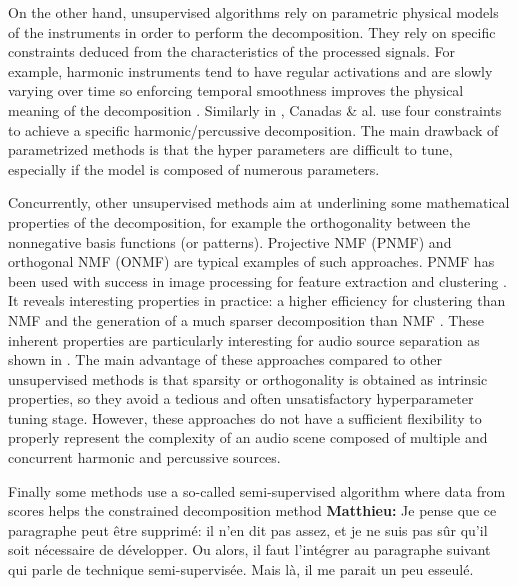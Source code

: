 \documentclass[journal]{IEEEtran}
\def\MK{\color{blue} {\bf Matthieu:} }
\begin{document}
On the other hand, unsupervised algorithms rely on parametric physical models of the instruments in order to perform the decomposition. They rely on specific constraints deduced from the characteristics of the processed signals. For example, harmonic instruments tend to have regular activations and are slowly varying over time so enforcing temporal smoothness improves the physical meaning of the decomposition \cite{Virtanen}. Similarly in \cite{canadas2014percussive}, Canadas \& al. use four constraints to achieve a specific harmonic/percussive decomposition. The main drawback of parametrized methods is that the hyper parameters are difficult to tune, especially if the model is composed of numerous parameters. 

Concurrently, other unsupervised methods aim at underlining some mathematical properties of the decomposition, for example the orthogonality between the nonnegative basis functions (or patterns). Projective NMF (PNMF) and orthogonal NMF (ONMF) are typical examples of such approaches. PNMF has been used with success in image processing \cite{choi} for feature extraction and clustering \cite{YangOja10}. It reveals interesting properties in practice: a higher efficiency for clustering than NMF \cite{choi} and the generation of a much sparser decomposition than NMF \cite{YangOja10}. These inherent properties are particularly interesting for audio source separation as shown in \cite{canadas2014percussive,vincent2010adaptive}. 
The main advantage of these approaches compared to other unsupervised methods is that sparsity or orthogonality is obtained as intrinsic properties, so they avoid a tedious and often unsatisfactory hyperparameter tuning stage. However, these approaches do not have a sufficient flexibility to properly represent the complexity of an audio scene composed of multiple and concurrent harmonic and percussive sources.


Finally some methods use a so-called semi-supervised algorithm where data from scores helps the constrained decomposition method \cite{hennequin2011score,fritsch2013score} {\MK Je pense que ce paragraphe peut être supprimé: il n'en dit pas assez, et je ne suis pas sûr qu'il soit nécessaire de développer. Ou alors, il faut l'intégrer au paragraphe suivant qui parle de technique semi-supervisée. Mais là, il me parait un peu esseulé.}
\end{document}
